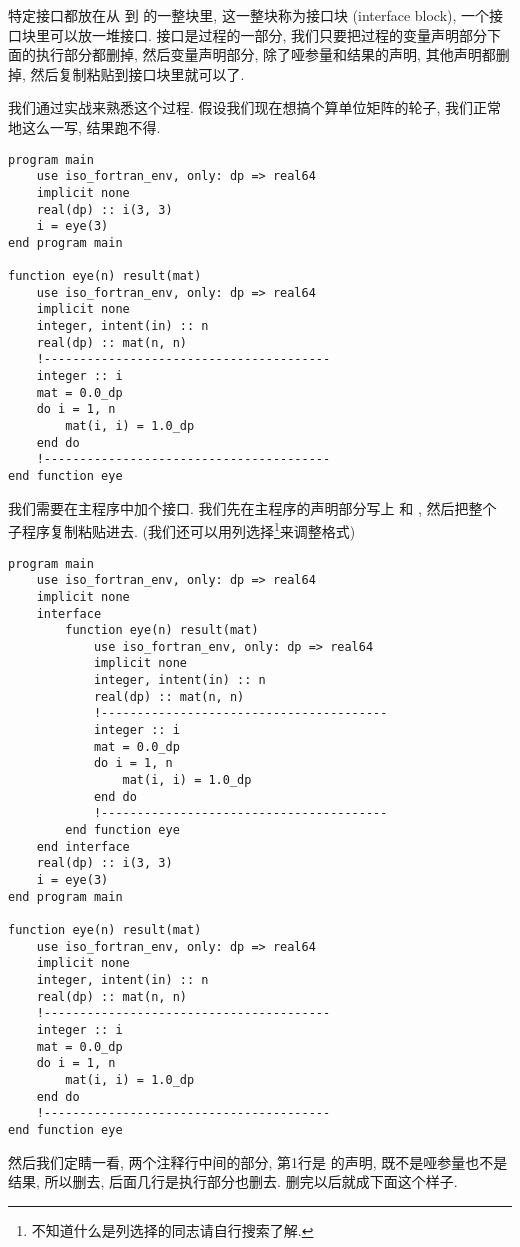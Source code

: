 特定接口都放在从  到  的一整块里, 这一整块称为接口块 (interface block), 一个接口块里可以放一堆接口. 接口是过程的一部分, 我们只要把过程的变量声明部分下面的执行部分都删掉, 然后变量声明部分, 除了哑参量和结果的声明, 其他声明都删掉, 然后复制粘贴到接口块里就可以了. 

我们通过实战来熟悉这个过程. 假设我们现在想搞个算单位矩阵的轮子, 我们正常地这么一写, 结果跑不得. 
\begin{lstlisting} 
program main
    use iso_fortran_env, only: dp => real64
    implicit none
    real(dp) :: i(3, 3)
    i = eye(3)
end program main

function eye(n) result(mat)
    use iso_fortran_env, only: dp => real64
    implicit none
    integer, intent(in) :: n
    real(dp) :: mat(n, n)
    !----------------------------------------
    integer :: i
    mat = 0.0_dp
    do i = 1, n
        mat(i, i) = 1.0_dp
    end do
    !----------------------------------------
end function eye
\end{lstlisting} 
我们需要在主程序中加个接口. 我们先在主程序的声明部分写上  和 , 然后把整个  子程序复制粘贴进去. (我们还可以用列选择\footnote{不知道什么是列选择的同志请自行搜索了解.}来调整格式)
\begin{lstlisting} 
program main
    use iso_fortran_env, only: dp => real64
    implicit none
    interface
        function eye(n) result(mat)
            use iso_fortran_env, only: dp => real64
            implicit none
            integer, intent(in) :: n
            real(dp) :: mat(n, n)
            !----------------------------------------
            integer :: i
            mat = 0.0_dp
            do i = 1, n
                mat(i, i) = 1.0_dp
            end do
            !----------------------------------------
        end function eye
    end interface
    real(dp) :: i(3, 3)
    i = eye(3)
end program main

function eye(n) result(mat)
    use iso_fortran_env, only: dp => real64
    implicit none
    integer, intent(in) :: n
    real(dp) :: mat(n, n)
    !----------------------------------------
    integer :: i
    mat = 0.0_dp
    do i = 1, n
        mat(i, i) = 1.0_dp
    end do
    !----------------------------------------
end function eye
\end{lstlisting} 
然后我们定睛一看, 两个注释行中间的部分, 第1行是  的声明,  既不是哑参量也不是结果, 所以删去, 后面几行是执行部分也删去. 删完以后就成下面这个样子. 
